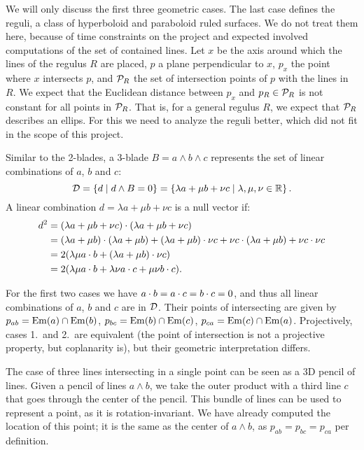 We will only discuss the first three geometric cases.  The last case defines the reguli, a class of hyperboloid and paraboloid ruled surfaces.  We do not treat them here, because of time constraints on the project and expected involved computations of the set of contained lines.  Let $x$ be the axis around which the lines of the regulus $R$ are placed, $p$ a plane perpendicular to $x$, $p_x$ the point where $x$ intersects $p$, and $\mathcal{P}_R$ the set of intersection points of $p$ with the lines in $R$.  We expect that the Euclidean distance between $p_x$ and $p_R \in \mathcal{P}_R$ is not constant for all points in $\mathcal{P}_R$.  That is, for a general regulus $R$, we expect that $\mathcal{P}_R$ describes an ellips.  For this we need to analyze the reguli better, which did not fit in the scope of this project.

Similar to the 2-blades, a 3-blade $B = a \wedge b \wedge c$ represents the set of linear combinations of $a$, $b$ and $c$:
\begin{equation*}
  \mathcal{D} = \left\{d \mid d \wedge B = 0 \right\} = \left\{ \lambda a + \mu b + \nu c \mid \lambda, \mu, \nu \in \mathbb{R} \right\} .
\end{equation*}
A linear combination $d = \lambda a + \mu b + \nu c$ is a null vector if:
\begin{align*}
  d^2 &= (\lambda a + \mu b + \nu c) \mathbin{\cdot} (\lambda a + \mu b + \nu c) \\
  &= (\lambda a + \mu b) \mathbin{\cdot} (\lambda a + \mu b) + (\lambda a + \mu b) \mathbin{\cdot} \nu c + \nu c \mathbin{\cdot} (\lambda a + \mu b) + \nu c \mathbin{\cdot} \nu c \\
  &= 2 (\lambda \mu a \mathbin{\cdot} b + (\lambda a + \mu b) \mathbin{\cdot} \nu c) \\
  &= 2 (\lambda \mu a \mathbin{\cdot} b + \lambda \nu a \mathbin{\cdot} c + \mu \nu b \mathbin{\cdot} c) .
\end{align*}

For the first two cases we have $a \mathbin{\cdot} b = a \mathbin{\cdot} c = b \mathbin{\cdot} c = 0$, and thus all linear combinations of $a$, $b$ and $c$ are in $\mathcal{D}$.  Their points of intersecting are given by $p_{ab} = \operatorname{Em}(a) \cap \operatorname{Em}(b)$, $p_{bc} = \operatorname{Em}(b) \cap \operatorname{Em}(c)$, $p_{ca} = \operatorname{Em}(c) \cap \operatorname{Em}(a)$.  Projectively, cases 1.\ and 2.\ are equivalent (the point of intersection is not a projective property, but coplanarity is), but their geometric interpretation differs.

The case of three lines intersecting in a single point can be seen as a 3D pencil of lines.  Given a pencil of lines $a \wedge b$, we take the outer product with a third line $c$ that goes through the center of the pencil.  This bundle of lines can be used to represent a point, as it is rotation-invariant.  We have already computed the location of this point; it is the same as the center of $a \wedge b$, as $p_{ab} = p_{bc} = p_{ca}$ per definition.

